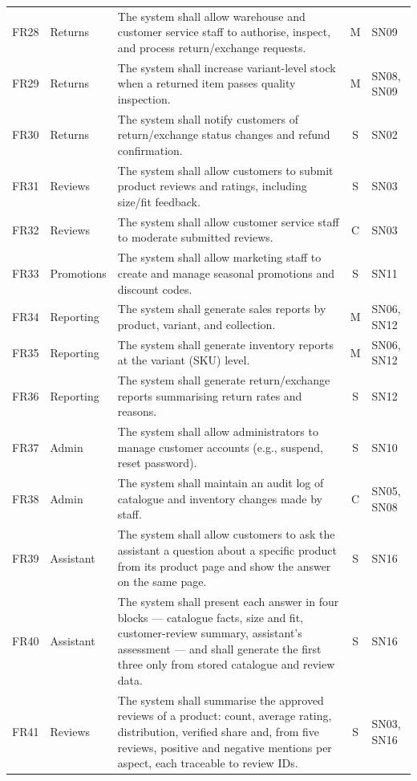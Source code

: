 \documentclass[11pt,a4paper,oneside]{extreport}
\newif\ifshowvtwo
\newcommand{\vtwocolor}{\ifshowvtwo\color{red}\fi}
\newcommand{\R}{\leavevmode\vtwocolor}   %
\begin{document}
{\begin{xltabular}{\textwidth}{@{}l L{1.7cm} Y c L{1.55cm}@{}}
FR28 & Returns & The system shall allow warehouse and customer service staff to authorise, inspect, and process return/exchange requests. & M & SN09 \\
FR29 & Returns & The system shall increase variant-level stock when a returned item passes quality inspection. & M & SN08, SN09 \\
FR30 & Returns & The system shall notify customers of return/exchange status changes and refund confirmation. & S & SN02 \\
FR31 & Reviews & The system shall allow customers to submit product reviews and ratings, including size/fit feedback. & S & SN03 \\
FR32 & Reviews & The system shall allow customer service staff to moderate submitted reviews. & C & SN03 \\
FR33 & Promotions & The system shall allow marketing staff to create and manage seasonal promotions and discount codes. & S & SN11 \\
FR34 & Reporting & The system shall generate sales reports by product, variant, and collection. & M & SN06, SN12 \\
FR35 & Reporting & The system shall generate inventory reports at the variant (SKU) level. & M & SN06, SN12 \\
FR36 & Reporting & The system shall generate return/exchange reports summarising return rates and reasons. & S & SN12 \\
FR37 & Admin & The system shall allow administrators to manage customer accounts (e.g., suspend, reset password). & S & SN10 \\
FR38 & Admin & The system shall maintain an audit log of catalogue and inventory changes made by staff. & C & SN05, SN08 \\
\R FR39 & \R Assistant & \R The system shall allow customers to ask the assistant a question about a specific product from its product page and show the answer on the same page. & \R S & \R SN16 \\
\R FR40 & \R Assistant & \R The system shall present each answer in four blocks --- catalogue facts, size and fit, customer-review summary, assistant's assessment --- and shall generate the first three only from stored catalogue and review data. & \R S & \R SN16 \\
\R FR41 & \R Reviews & \R The system shall summarise the approved reviews of a product: count, average rating, distribution, verified share and, from five reviews, positive and negative mentions per aspect, each traceable to review IDs. & \R S & \R SN03, SN16 \\

\end{xltabular}}
\end{document}
